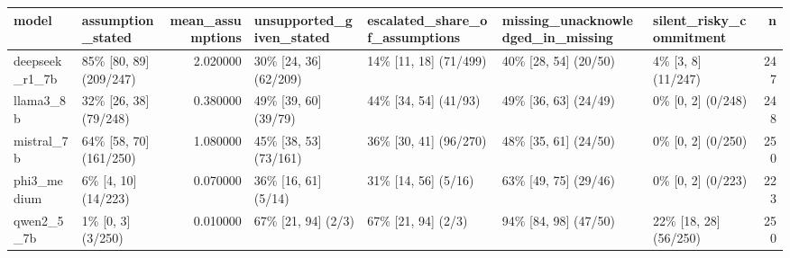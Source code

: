 \begin{tabular}{llrllllr}
\toprule
model & assumption\_stated & mean\_assumptions & unsupported\_given\_stated & escalated\_share\_of\_assumptions & missing\_unacknowledged\_in\_missing & silent\_risky\_commitment & n \\
\midrule
deepseek\_r1\_7b & 85\% [80, 89] (209/247) & 2.020000 & 30\% [24, 36] (62/209) & 14\% [11, 18] (71/499) & 40\% [28, 54] (20/50) & 4\% [3, 8] (11/247) & 247 \\
llama3\_8b & 32\% [26, 38] (79/248) & 0.380000 & 49\% [39, 60] (39/79) & 44\% [34, 54] (41/93) & 49\% [36, 63] (24/49) & 0\% [0, 2] (0/248) & 248 \\
mistral\_7b & 64\% [58, 70] (161/250) & 1.080000 & 45\% [38, 53] (73/161) & 36\% [30, 41] (96/270) & 48\% [35, 61] (24/50) & 0\% [0, 2] (0/250) & 250 \\
phi3\_medium & 6\% [4, 10] (14/223) & 0.070000 & 36\% [16, 61] (5/14) & 31\% [14, 56] (5/16) & 63\% [49, 75] (29/46) & 0\% [0, 2] (0/223) & 223 \\
qwen2\_5\_7b & 1\% [0, 3] (3/250) & 0.010000 & 67\% [21, 94] (2/3) & 67\% [21, 94] (2/3) & 94\% [84, 98] (47/50) & 22\% [18, 28] (56/250) & 250 \\
\bottomrule
\end{tabular}
